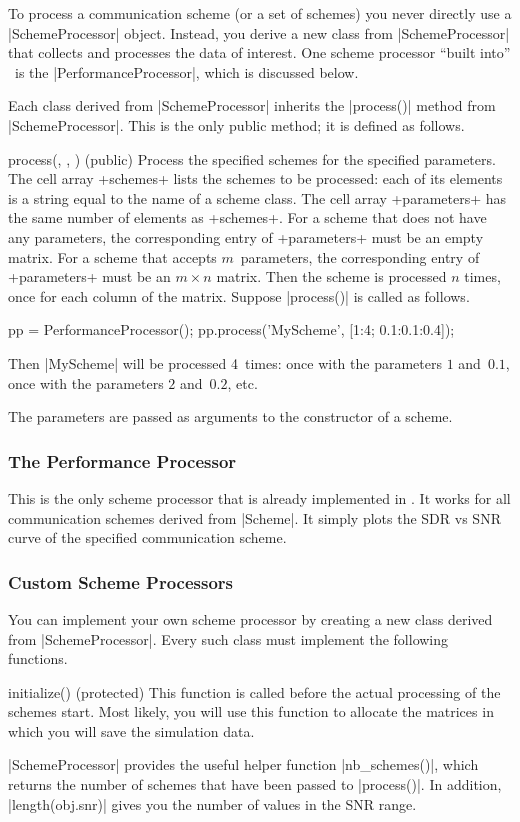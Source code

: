 To process a communication scheme (or a set of schemes) you never directly use
a |SchemeProcessor| object. Instead, you derive a new class from
|SchemeProcessor| that collects and processes the data of interest. One scheme
processor ``built into'' \jscsim\ is the |PerformanceProcessor|, which is
discussed below.

Each class derived from |SchemeProcessor| inherits the |process()| method from
|SchemeProcessor|. This is the only public method; it is defined as follows. 
\begin{method}{process(\obj, , ) (public)}
  Process the specified schemes for the specified parameters. The cell array
  +schemes+ lists the schemes to be processed: each of its elements is a string
  equal to the name of a scheme class. The cell array +parameters+ has the same
  number of elements as +schemes+. For a scheme that does not have any
  parameters, the corresponding entry of +parameters+ must be an empty matrix.
  For a scheme that accepts $m$~parameters, the corresponding entry of
  +parameters+ must be an $m \times n$ matrix. Then the scheme is processed $n$
  times, once for each column of the matrix.
  \codeexample Suppose |process()| is called as follows.
  \begin{Code}
  pp = PerformanceProcessor();
  pp.process({'MyScheme'}, {[1:4; 0.1:0.1:0.4]});
  \end{Code}
  Then |MyScheme| will be processed 4~times: once with the parameters $1$
  and~$0.1$, once with the parameters $2$ and~$0.2$, etc.

  The parameters are passed as arguments to the constructor of a scheme.
\end{method}


\subsubsection{The Performance Processor}

This is the only scheme processor that is already implemented in \jscsim. It
works for all communication schemes derived from |Scheme|. It simply plots the
SDR vs SNR curve of the specified communication scheme. 


\subsubsection{Custom Scheme Processors}

You can implement your own scheme processor by creating a new class derived from
|SchemeProcessor|. Every such class must implement the following functions.
\begin{method}{initialize(\obj) (protected)}
  This function is called before the actual
  processing of the schemes start. Most likely, you will use this function to
  allocate the matrices in which you will save the simulation data. 

  |SchemeProcessor| provides the useful helper function |nb_schemes()|, which
  returns the number of schemes that have been passed to |process()|. In
  addition, |length(obj.snr)| gives you the number of values in the SNR range.
\end{method}

